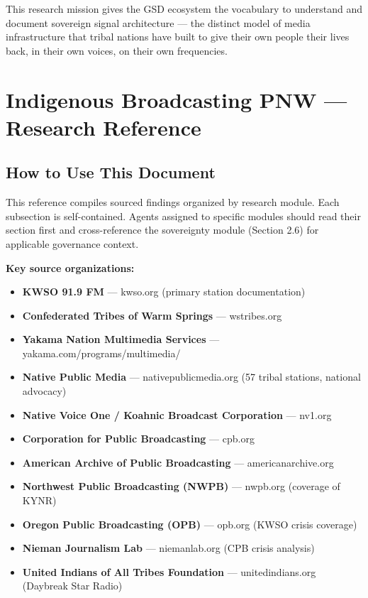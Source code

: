 \documentclass[11pt,letterpaper]{article}
\newcommand{\stageheader}[2]{%
  \noindent\colorbox{#2}{\makebox[\textwidth][l]{%
    \textcolor{white}{\bfseries\sffamily\hspace{6pt}#1\hspace{6pt}}}}%
  \vspace{0.5em}\par%
}
\begin{document}
This research mission gives the GSD ecosystem the vocabulary to understand and document sovereign signal architecture --- the distinct model of media infrastructure that tribal nations have built to give their own people their lives back, in their own voices, on their own frequencies.

\newpage

\stageheader{STAGE 2 --- RESEARCH REFERENCE}{secondary}

\section{Indigenous Broadcasting PNW --- Research Reference}

\subsection{How to Use This Document}

This reference compiles sourced findings organized by research module. Each subsection is self-contained. Agents assigned to specific modules should read their section first and cross-reference the sovereignty module (Section 2.6) for applicable governance context.

\textbf{Key source organizations:}
\begin{itemize}[leftmargin=2em]
  \item \textbf{KWSO 91.9 FM} --- kwso.org (primary station documentation)
  \item \textbf{Confederated Tribes of Warm Springs} --- wstribes.org
  \item \textbf{Yakama Nation Multimedia Services} --- yakama.com/programs/multimedia/
  \item \textbf{Native Public Media} --- nativepublicmedia.org (57 tribal stations, national advocacy)
  \item \textbf{Native Voice One / Koahnic Broadcast Corporation} --- nv1.org
  \item \textbf{Corporation for Public Broadcasting} --- cpb.org
  \item \textbf{American Archive of Public Broadcasting} --- americanarchive.org
  \item \textbf{Northwest Public Broadcasting (NWPB)} --- nwpb.org (coverage of KYNR)
  \item \textbf{Oregon Public Broadcasting (OPB)} --- opb.org (KWSO crisis coverage)
  \item \textbf{Nieman Journalism Lab} --- niemanlab.org (CPB crisis analysis)
  \item \textbf{United Indians of All Tribes Foundation} --- unitedindians.org (Daybreak Star Radio)
\end{itemize}
\end{document}
